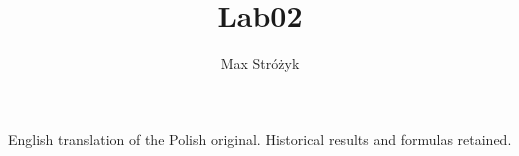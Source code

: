 \documentclass[a4paper, 11pt]{article}
\title{Lab02}
\author{Max Stróżyk}
\begin{document}
\maketitle
\begin{center}\small English translation of the Polish original. Historical results and formulas retained.\end{center}
\tableofcontents



\newpage




\newpage



\newpage




\newpage


\end{document}
